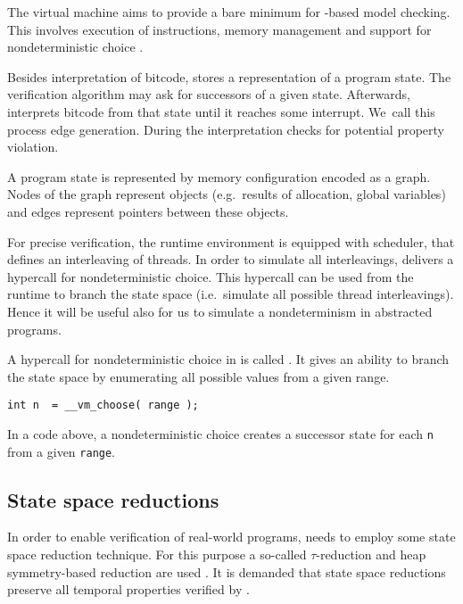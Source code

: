 The \DIVINE virtual machine aims to provide a bare mini\-mum for \LLVM-based model
checking. This involves execution of instructions, memory management and support
for nondeterministic choice \cite{RockaiCB17}.

Besides interpretation of \LLVM bitcode, \DIVM stores a representation of a
program state. The verification algorithm may ask \DIVM for successors of a
given state. Afterwards, \DIVM interprets \LLVM bitcode from that state until it
reaches some interrupt. We~call this process edge generation. During
the interpretation \DIVM checks for potential property violation.

A program state is represented by memory configuration encoded as a graph.
Nodes of the graph represent objects (e.g.~results of allocation, global
variables) and edges represent pointers between these objects.

For precise verification, the runtime environment is equipped with scheduler,
that defines an interleaving of threads. In order to simulate all interleavings,
\DIVM delivers a hypercall for nondeterministic choice. This hypercall can be
used from the runtime to branch the state space (i.e.~simulate all possible
thread interleavings). Hence it will be useful also
for us to simulate a nondeterminism in abstracted programs.

\begin{example}
A hypercall for nondeterministic choice in \DIVM is called .
It gives an ability to branch the state space by enumerating all possible values
from a given range.

\begin{verbatim}
int n  = __vm_choose( range );
\end{verbatim}
\noindent
In a code above, a nondeterministic choice creates a successor state for each
\texttt{n} from a given \texttt{range}.

\end{example}
\subsection{State space reductions}

In order to enable verification of real-world programs, \DIVINE needs to employ
some state space reduction technique. For this purpose a so-called
$\tau$-reduction and heap symmetry-based reduction are used \cite{Rockai13,
RockaiCB17}.  It is
demanded that state space reductions preserve all temporal properties
verified by \DIVINE.

